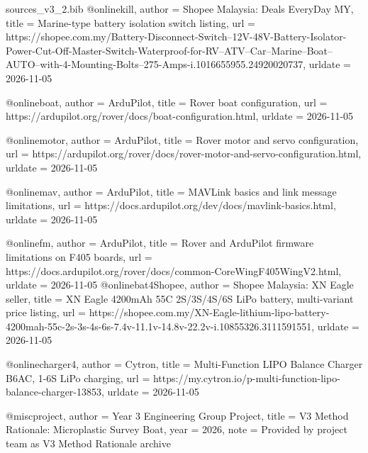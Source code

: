 \begin{filecontents*}[overwrite]{sources_v3_2.bib}
@online{kill,
  author = {Shopee Malaysia: Deals EveryDay MY},
  title = {Marine-type battery isolation switch listing},
  url = {https://shopee.com.my/Battery-Disconnect-Switch--12V-48V-Battery-Isolator-Power-Cut-Off-Master-Switch-Waterproof-for-RV--ATV--Car--Marine--Boat--AUTO--with-4-Mounting-Bolts--275-Amps-i.1016655955.24920020737},
  urldate = {2026-11-05}
}

@online{boat,
  author = {ArduPilot},
  title = {Rover boat configuration},
  url = {https://ardupilot.org/rover/docs/boat-configuration.html},
  urldate = {2026-11-05}
}

@online{motor,
  author = {ArduPilot},
  title = {Rover motor and servo configuration},
  url = {https://ardupilot.org/rover/docs/rover-motor-and-servo-configuration.html},
  urldate = {2026-11-05}
}

@online{mav,
  author = {ArduPilot},
  title = {MAVLink basics and link message limitations},
  url = {https://docs.ardupilot.org/dev/docs/mavlink-basics.html},
  urldate = {2026-11-05}
}

@online{fm,
  author = {ArduPilot},
  title = {Rover and ArduPilot firmware limitations on F405 boards},
  url = {https://docs.ardupilot.org/rover/docs/common-CoreWingF405WingV2.html},
  urldate = {2026-11-05}
}
@online{bat4Shopee,
  author = {Shopee Malaysia: XN Eagle seller},
  title = {XN Eagle 4200mAh 55C 2S/3S/4S/6S LiPo battery, multi-variant price listing},
  url = {https://shopee.com.my/XN-Eagle-lithium-lipo-battery-4200mah-55c-2s-3s-4s-6s-7.4v-11.1v-14.8v-22.2v-i.10855326.3111591551},
  urldate = {2026-11-05}
}

@online{charger4,
  author = {Cytron},
  title = {Multi-Function LIPO Balance Charger B6AC, 1-6S LiPo charging},
  url = {https://my.cytron.io/p-multi-function-lipo-balance-charger-13853},
  urldate = {2026-11-05}
}

@misc{project,
  author = {Year 3 Engineering Group Project},
  title = {V3 Method Rationale: Microplastic Survey Boat},
  year = {2026},
  note = {Provided by project team as V3 Method Rationale archive}
}



\end{filecontents*}
